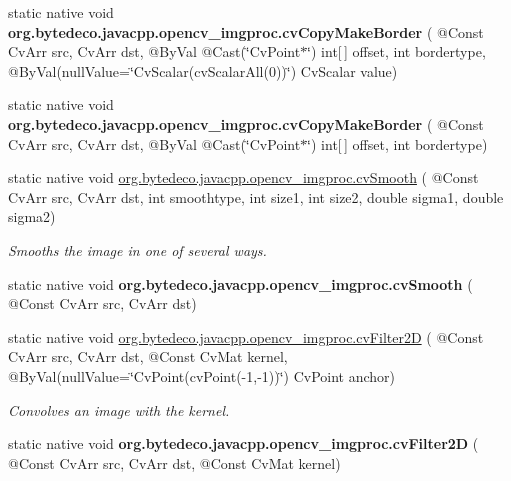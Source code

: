 \begin{DoxyCompactItemize}
static native void {\bfseries org.\+bytedeco.\+javacpp.\+opencv\+\_\+imgproc.\+cv\+Copy\+Make\+Border} ( @Const Cv\+Arr src, Cv\+Arr dst, @By\+Val @Cast(\char`\"{}Cv\+Point$\ast$\char`\"{}) int\mbox{[}$\,$\mbox{]} offset, int bordertype, @By\+Val(null\+Value=\char`\"{}Cv\+Scalar(cv\+Scalar\+All(0))\char`\"{}) Cv\+Scalar value)
\item 
\mbox{\label{group__imgproc__c_ga897db9c2bd9a4fed6a2105c60cec0366}} 
static native void {\bfseries org.\+bytedeco.\+javacpp.\+opencv\+\_\+imgproc.\+cv\+Copy\+Make\+Border} ( @Const Cv\+Arr src, Cv\+Arr dst, @By\+Val @Cast(\char`\"{}Cv\+Point$\ast$\char`\"{}) int\mbox{[}$\,$\mbox{]} offset, int bordertype)
\item 
static native void \hyperlink{group__imgproc__c_ga32746ef0800c2dfaad0e63fd8138362d}{org.\+bytedeco.\+javacpp.\+opencv\+\_\+imgproc.\+cv\+Smooth} ( @Const Cv\+Arr src, Cv\+Arr dst, int smoothtype, int size1, int size2, double sigma1, double sigma2)
\begin{DoxyCompactList}\small\item\em Smooths the image in one of several ways. \end{DoxyCompactList}\item 
\mbox{\label{group__imgproc__c_gaeee0d8ead6e7afe4492e929135e892fc}} 
static native void {\bfseries org.\+bytedeco.\+javacpp.\+opencv\+\_\+imgproc.\+cv\+Smooth} ( @Const Cv\+Arr src, Cv\+Arr dst)
\item 
static native void \hyperlink{group__imgproc__c_gaeb0ce4259621b5151099fcc7d4c25522}{org.\+bytedeco.\+javacpp.\+opencv\+\_\+imgproc.\+cv\+Filter2D} ( @Const Cv\+Arr src, Cv\+Arr dst, @Const Cv\+Mat kernel, @By\+Val(null\+Value=\char`\"{}Cv\+Point(cv\+Point(-\/1,-\/1))\char`\"{}) Cv\+Point anchor)
\begin{DoxyCompactList}\small\item\em Convolves an image with the kernel. \end{DoxyCompactList}\item 
\mbox{\label{group__imgproc__c_ga7b2b42203453476412b28c1a573f7dcc}} 
static native void {\bfseries org.\+bytedeco.\+javacpp.\+opencv\+\_\+imgproc.\+cv\+Filter2D} ( @Const Cv\+Arr src, Cv\+Arr dst, @Const Cv\+Mat kernel)
\item 
\mbox{\label{group__imgproc__c_ga190132c0c926ab198bcfd73d4b9da2fc}} 

\end{DoxyCompactItemize}
